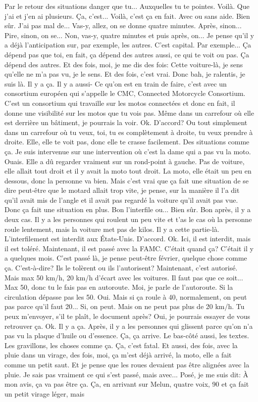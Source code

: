 Par le retour des situations danger que tu...
Auxquelles tu te pointes. Voilà. Que j'ai et j'en ai plusieurs. Ça, c'est... Voilà, c'est ça en fait. Avec ou sans aide. Bien sûr. J'ai pas mal de... Vas-y, allez, on se donne quatre minutes. Après, sinon... Pire, sinon, on se... Non, vas-y, quatre minutes et puis après, on... Je pense qu'il y a déjà l'anticipation sur, par exemple, les autres. C'est capital. Par exemple... Ça dépend pas que toi, en fait, ça dépend des autres aussi, ce qui te voit ou pas. Ça dépend des autres. Et des fois, moi, je me dis des fois: Cette voiture-là, je sens qu'elle ne m'a pas vu, je le sens. Et des fois, c'est vrai. Donc bah, je ralentis, je suis là. Il y a ça. Il y a aussi- Ce qu'on est en train de faire, c'est avec un consortium européen qui s'appelle le CMC, Connected Motorcycle Consortium. C'est un consortium qui travaille sur les motos connectées et donc en fait, il donne une visibilité sur les motos que tu vois pas. Même dans un carrefour où elle est derrière un bâtiment, je pourrais la voir. Ok. D'accord? Ou tout simplement dans un carrefour où tu veux, toi, tu es complètement à droite, tu veux prendre à droite. Elle, elle te voit pas, donc elle te crasse facilement. Des situations comme ça. Je suis intervenue sur une intervention où c'est la dame qui a pas vu la moto. Ouais. Elle a dû regarder vraiment sur un rond-point à gauche. Pas de voiture, elle allait tout droit et il y avait la moto tout droit. La moto, elle était un peu en dessous, donc la personne va bien. Mais c'est vrai que ça fait une situation de se dire peut-être que le motard allait trop vite, je pense, sur la manière il l'a dit qu'il avait mis de l'angle et il avait pas regardé la voiture qu'il avait pas vue. Donc ça fait une situation en plus. Bon l'interfile ou... Bien sûr. Bon après, il y a deux cas. Il y a les personnes qui roulent un peu vite et t'as le cas où la personne roule lentement, mais la voiture met pas de kilos. Il y a cette partie-là. L'interfilement est interdit aux États-Unis. D'accord. Ok. Ici, il est interdit, mais il est toléré. Maintenant, il est passé avec la FAMC. C'était quand ça? C'était il y a quelques mois. C'est passé là, je pense peut-être février, quelque chose comme ça. C'est-à-dire? Ils le tolèrent ou ils l'autorisent? Maintenant, c'est autorisé. Mais max 50 km/h, 20 km/h d'écart avec les voitures. Il faut pas que ce soit... Max 50, donc tu le fais pas en autoroute. Moi, je parle de l'autoroute. Si la circulation dépasse pas les 50. Oui. Mais si ça roule à 40, normalement, on peut pas parce qu'il faut 20... Si, on peut. Mais on ne peut pas plus de 20 km/h. Tu peux m'envoyer, s'il te plaît, le document après? Oui, je pourrais essayer de vous retrouver ça. Ok. Il y a ça. Après, il y a les personnes qui glissent parce qu'on n'a pas vu la plaque d'huile ou d'essence. Ça, ça arrive. Le bas-côté aussi, les textes. Les gravillons, les choses comme ça. Ça, c'est fatal. Et aussi, des fois, avec la pluie dans un virage, des fois, moi, ça m'est déjà arrivé, la moto, elle a fait comme un petit saut. Et je pense que les roues devaient pas être alignées avec la pluie. Je sais pas vraiment ce qui s'est passé, mais avec... Posé, je me suis dit: À mon avis, ça va pas être ça. Ça, en arrivant sur Melun, quatre voix, 90 et ça fait un petit virage léger, mais 